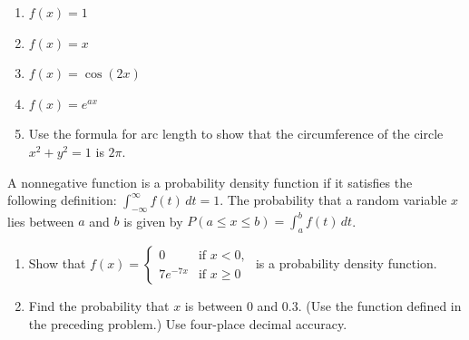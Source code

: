 \documentclass{exercises}
\begin{document}
\begin{enumerate}[resume]
\item $f(x)=1$
\item $f(x)=x$
\item $f(x)=\cos(2x)$
\item $f(x)=e^{ax}$
\item Use the formula for arc length to show that the circumference of the circle $x^{2}+y^{2}=1$ is $2\pi$.
\end{enumerate}

A nonnegative function is a probability density function if it satisfies the following definition: $\int_{-\infty}^{\infty}f(t)\,dt=1$. The probability that a random variable $x$ lies between $a$ and $b$ is given by $P(a\le x\le b)=\int_{a}^{b}f(t)\,dt$.

\begin{enumerate}[resume]
\item Show that $f(x)=\begin{cases}0 & \text{if }x<0, \\ 7e^{-7x} & \text{if }x\ge 0\end{cases}$ is a probability density function.
\item Find the probability that $x$ is between $0$ and $0.3$. (Use the function defined in the preceding problem.) Use four-place decimal accuracy.
\end{enumerate}
\end{document}
